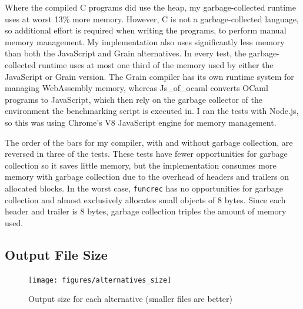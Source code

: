 Where the compiled C programs did use the heap, my garbage-collected runtime uses at worst 13\% more memory. However, C is not a garbage-collected language, so additional effort is required when writing the programs, to perform manual memory management. My implementation also uses significantly less memory than both the JavaScript and Grain alternatives. In every test, %
the garbage-collected runtime uses at most one third of the memory used by either the JavaScript or Grain version. 
The Grain compiler has its own runtime system for managing WebAssembly memory, whereas Js\_of\_ocaml converts OCaml programs to JavaScript, which then rely on the garbage collector of the environment the benchmarking script is executed in. I ran the tests with Node.js, so this was using Chrome's V8 JavaScript engine for memory management.


The order of the bars for my compiler, with and without garbage collection, are reversed in three of the tests. These tests have fewer opportunities for garbage collection so it saves little memory, but the implementation consumes more memory with garbage collection due to the overhead of headers and trailers on allocated blocks. In the worst case, \verb|funcrec| has no opportunities for garbage collection and almost exclusively allocates small objects of 8 bytes. Since each header and trailer is 8 bytes, garbage collection triples the amount of memory used.



\subsection{Output File Size}

\begin{figure}[H]
\hspace{-1cm}
\texttt{[image: figures/alternatives\_size]}
\vspace{-0.8cm}
\caption{Output size for each alternative (smaller files are better)}
 \label{fig:alt_size} 
\end{figure}

